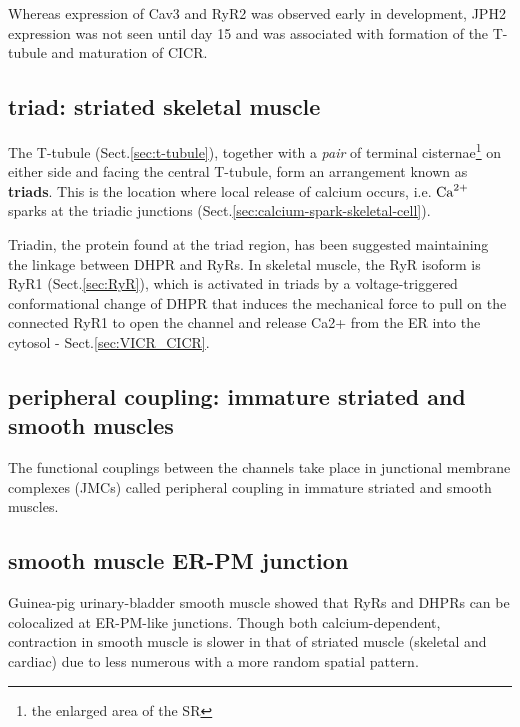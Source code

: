 Whereas expression of Cav3 and RyR2 was observed early in development, JPH2
expression was not seen until day 15 and was associated with formation of the
T-tubule and maturation of CICR.

\subsection{triad: striated skeletal muscle}
\label{sec:triad}

The T-tubule (Sect.\ref{sec:t-tubule}), together with a {\it pair} of terminal
cisternae\footnote{the enlarged area of the SR} on either side and facing the
central T-tubule, form an arrangement known as {\bf triads}.
This is the location where local release of calcium occurs, i.e. ${\text{Ca}^{2+}}$ sparks
at the triadic junctions (Sect.\ref{sec:calcium-spark-skeletal-cell}).


Triadin, the protein found at the triad region, has been suggested maintaining
the linkage between DHPR and RyRs.
In skeletal muscle, the RyR isoform is RyR1 (Sect.\ref{sec:RyR}), which is
activated in triads by a voltage-triggered conformational change of DHPR that
induces the mechanical force to pull on the connected RyR1 to open the channel
and release Ca2+ from the ER into the cytosol - Sect.\ref{sec:VICR_CICR}.


\subsection{peripheral coupling: immature striated and
smooth muscles}
\label{sec:peripheral-coupling}

The functional couplings between the channels take place in junctional membrane
complexes (JMCs) called peripheral coupling in immature striated and smooth
muscles.

% 

\subsection{smooth muscle ER-PM junction}

Guinea-pig urinary-bladder smooth muscle showed that RyRs and DHPRs can be
colocalized at ER-PM-like junctions. 
Though both calcium-dependent, contraction in smooth muscle is
slower in that of striated muscle (skeletal and cardiac) due to 
less numerous with a more random spatial pattern.

